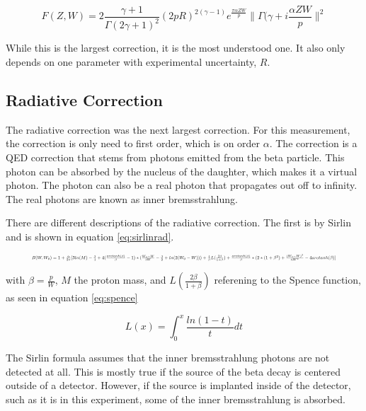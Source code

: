 \documentclass[../MaxHughesThesis.tex]{subfiles}
\begin{document}
\begin{equation}
	F(Z,W) = 2\frac{\gamma + 1}{\Gamma(2\gamma +1)^{2}}(2pR)^{2(\gamma - 1)}e^{\frac{\pi\alpha ZW}{p}}\|\Gamma(\gamma + i\frac{\alpha ZW}{p}\|^{2}
	\label{eq:fermifunc}
\end{equation}

While this is the largest correction, it is the most understood one.
It also only depends on one parameter with experimental uncertainty, $R$. 


\subsection{Radiative Correction}
The radiative correction was the next largest correction.
For this measurement, the correction is only need to first order, which is on order $\alpha$.
The correction is a QED correction that stems from photons emitted from the beta particle.
This photon can be absorbed by the nucleus of the daughter, which makes it a virtual photon.
The photon can also be a real photon that propagates out off to infinity.
The real photons are known as inner bremsstrahlung.

There are different descriptions of the radiative correction.  
The first is by Sirlin \cite{Sir67} and is shown in equation \ref{eq:sirlinrad}.

\begin{equation}
	\resizebox{.9\textwidth}{!}
	{
	$R(W,W_{0}) = 1 + \frac{\alpha}{2\pi}[3ln(M) - \frac{3}{4} + 4(\frac{arctanh(\beta)}{\beta} - 1)*(\frac{W_{0} - W}{3W} - \frac{3}{2} + ln(2(W_{0} - W))) + \frac{4}{\beta}L(\frac{2\beta}{1 + \beta}) + \frac{arctanh(\beta)}{\beta}*(2*(1 + \beta^{2}) + \frac{(W_{0} - W)^{2}}{6W^{2}} - 4 arctanh(\beta)]$
	}
	\label{eq:sirlinrad}
\end{equation} 

with $\beta = \frac{p}{W}$, $M$ the proton mass, and $L(\frac{2\beta}{1+\beta})$ referening to the Spence function, as seen in equation \ref{eq:spence} \cite{Wil95}

\begin{equation}
	L(x) = \int_{0}^{x} \frac{ln(1 - t)}{t}dt
	\label{eq:spence}
\end{equation}

The Sirlin formula assumes that the inner bremsstrahlung photons are not detected at all.
This is mostly true if the source of the beta decay is centered outside of a detector.
However, if the source is implanted inside of the detector, such as it is in this experiment, some of the inner bremsstrahlung is absorbed.
\end{document}
